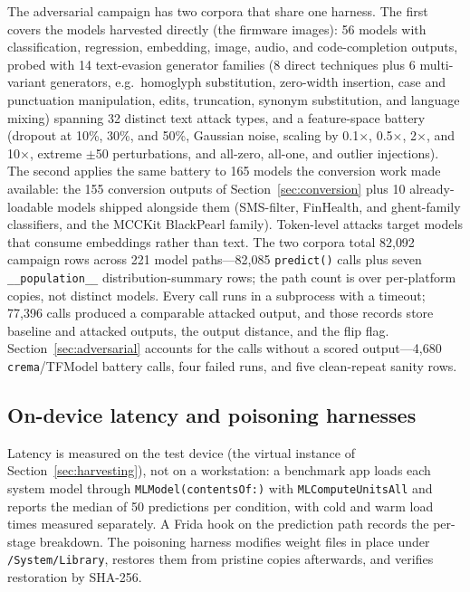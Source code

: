 \documentclass[letterpaper,twocolumn,10pt]{article}
\begin{document}
The adversarial campaign has two corpora that share one harness.
The first covers the models harvested directly (the firmware images): 56
models with classification, regression, embedding, image, audio, and
code-completion outputs, probed with 14 text-evasion generator families (8
direct techniques plus 6 multi-variant generators, e.g.\ homoglyph
substitution, zero-width insertion, case and punctuation manipulation,
edits, truncation, synonym substitution, and language mixing) spanning 32
distinct text attack types, and
a feature-space battery (dropout at 10\%, 30\%, and 50\%, Gaussian noise,
scaling by 0.1$\times$, 0.5$\times$, 2$\times$, and
10$\times$, extreme $\pm$50 perturbations, and all-zero, all-one, and
outlier injections).
The second applies the same battery to 165 models the conversion work made
available: the 155 conversion outputs of Section~\ref{sec:conversion} plus
10 already-loadable models shipped alongside them (SMS-filter, FinHealth,
and ghent-family classifiers, and the MCCKit BlackPearl family).
Token-level attacks target models that consume embeddings rather than text.
The two corpora total 82{,}092 campaign rows across 221 model
paths---82{,}085 \texttt{predict()} calls plus seven \texttt{\_\_population\_\_}
distribution-summary rows; the path count is over per-platform copies, not
distinct models. Every call runs in a subprocess with a timeout; 77{,}396
calls produced a comparable attacked output, and those records store
baseline and attacked outputs, the output distance, and the flip flag.
Section~\ref{sec:adversarial} accounts for the calls without a scored
output---4{,}680 \texttt{crema}/TFModel battery calls, four failed runs, and
five clean-repeat sanity rows.

\subsection{On-device latency and poisoning harnesses}

Latency is measured on the test device (the virtual instance of
Section~\ref{sec:harvesting}), not on a workstation: a
benchmark app loads each system model through
\texttt{MLModel(contentsOf:)} with \texttt{MLComputeUnitsAll} and reports
the median of 50 predictions per condition, with cold and warm load times
measured separately.
A Frida hook on the prediction path records the per-stage breakdown.
The poisoning harness modifies weight files in place under
\texttt{/System/Library}, restores them from pristine copies afterwards, and
verifies restoration by SHA-256.
\end{document}
